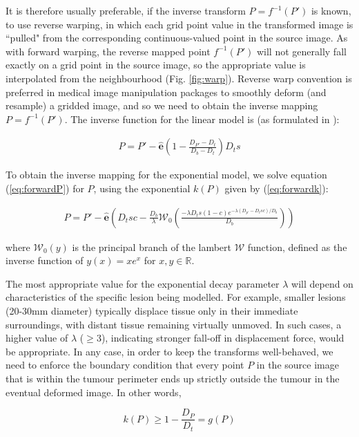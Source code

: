 It is therefore usually preferable, if the inverse transform $P = f^{-1}(P')$ is known, to use reverse warping, in which each grid point value in the transformed image is ``pulled" from the corresponding continuous-valued point in the source image.
As with forward warping, the reverse mapped point $f^{-1}(P')$ will not generally fall exactly on a grid point in the source image, so the appropriate value is interpolated from the neighbourhood (Fig. \ref{fig:warp}).
Reverse warp convention is preferred in medical image manipulation packages to smoothly deform (and resample) a gridded image, and so we need to obtain the inverse mapping $P = f^{-1}(P')$.
The inverse function for the linear model is (as formulated in \textcite{Nowinski2005}):

\begin{align}
  P = P' - \mathbf{\hat{e}}(1-\frac{D_{P'}-D_t}{D_b-D_t})D_ts
\end{align}

To obtain the inverse mapping for the exponential model, we solve equation (\ref{eq:forwardP}) for $P$, using the exponential $k(P)$ given by (\ref{eq:forwardk}):

\begin{align}
  P = P' - \mathbf{\hat{e}}(D_t s c - \frac{D_b}{\lambda}\mathcal{W}_0(\frac{-\lambda D_t s (1-c) e^{-\lambda(D_{p'}-D_tsc)/D_b}}{D_b}))
\end{align}

where $\mathcal{W}_0(y)$ is the principal branch of the lambert $\mathcal{W}$ function, defined as the inverse function of $ y(x) = xe^x $ for $x,y \in \mathbb{R}$. 

The most appropriate value for the exponential decay parameter $\lambda$ will depend on characteristics of the specific lesion being modelled.
For example, smaller lesions (20-30mm diameter) typically displace tissue only in their immediate surroundings, with distant tissue remaining virtually unmoved.
In such cases, a higher value of $\lambda$ ($\geq 3$), indicating stronger fall-off in displacement force, would be appropriate.%
In any case, in order to keep the transforms well-behaved, we need to enforce the boundary condition that every point $P$ in the source image that is within the tumour perimeter ends up strictly outside the tumour in the eventual deformed image.
In other words,

\begin{equation}\label{eq:lambdabound}
  k(P) \geq 1 - \frac{D_P}{D_t} = g(P)
\end{equation}

